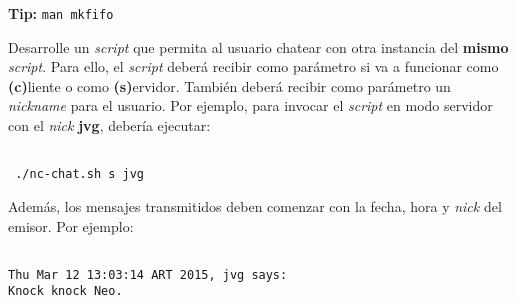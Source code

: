 \begin{questions}
  \textbf{Tip:} \texttt{man mkfifo}

  \question Desarrolle un \textit{script} que permita al usuario chatear
  con otra instancia del \textbf{mismo} \textit{script}. Para ello, el
  \textit{script} deberá recibir como parámetro si va a funcionar como
  \textbf{(c)}liente o como \textbf{(s)}ervidor. También deberá recibir
  como parámetro un \textit{nickname} para el usuario. Por ejemplo, para
  invocar el \textit{script} en modo servidor con el \textit{nick}
  \textbf{jvg}, debería ejecutar:

  \begin{lstlisting}

 ./nc-chat.sh s jvg
  \end{lstlisting}

Además, los mensajes transmitidos deben comenzar con la fecha, hora y
\textit{nick} del emisor. Por ejemplo:
\begin{lstlisting}
  
Thu Mar 12 13:03:14 ART 2015, jvg says:
Knock knock Neo.
\end{lstlisting}  

\end{questions}
